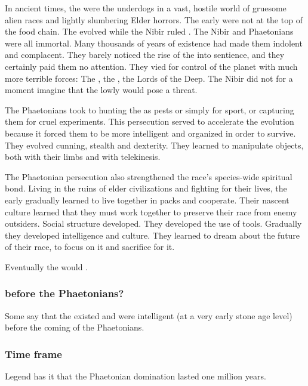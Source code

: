 In ancient times, the \ophidians were the underdogs in a vast, hostile world of gruesome alien races and lightly slumbering Elder horrors.
The early \ophidians were not at the top of the food chain. 
The \caisith evolved while the Nibir ruled \Miith. 
The Nibir and Phaetonians were all immortal. 
Many thousands of years of existence had made them indolent and complacent. 
They barely noticed the rise of the \caisith into sentience, and they certainly paid them no attention. 
They vied for control of the planet with much more terrible forces: 
The \moongods, the \vorcanths, the Lords of the Deep. 
The Nibir did not for a moment imagine that the lowly \caisith would pose a threat. 

The Phaetonians took to hunting the \caisith as pests or simply for sport, or capturing them for cruel experiments. 
This persecution served to accelerate the \caisith evolution because it forced them to be more intelligent and organized in order to survive. 
They evolved cunning, stealth and dexterity. 
They learned to manipulate objects, both with their limbs and with telekinesis. 

The Phaetonian persecution also strengthened the \caisith race's species-wide spiritual bond. 
Living in the ruins of elder civilizations and fighting for their lives, the early \ophidians gradually learned to live together in packs and cooperate. 
Their nascent culture learned that they must work together to preserve their race from enemy outsiders.
Social structure developed. 
They developed the use of tools. 
Gradually they developed intelligence and culture. 
They learned to dream about the future of their race, to focus on it and sacrifice for it.

Eventually the \caisith would .  





\subsubsection{\Ophidians before the Phaetonians?}
Some say that the \caisith existed and were intelligent (at a very early stone age level) before the coming of the Phaetonians. 





\subsubsection{Time frame}
Legend has it that the Phaetonian domination lasted one million years. 





